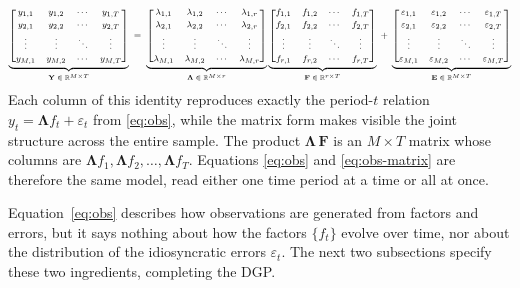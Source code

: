 \documentclass[11pt, a4paper, oneside]{article}
\newcommand{\mY}{\mathbf{Y}}
\newcommand{\mF}{\mathbf{F}}
\newcommand{\mL}{\boldsymbol{\Lambda}}
\newcommand{\mE}{\mathbf{E}}
\begin{document}
\[
{\footnotesize
\underbrace{\begin{bmatrix}
    y_{1,1} & y_{1,2} & \cdots & y_{1,T} \\[2pt]
    y_{2,1} & y_{2,2} & \cdots & y_{2,T} \\[2pt]
    \vdots  & \vdots  & \ddots & \vdots  \\[2pt]
    y_{M,1} & y_{M,2} & \cdots & y_{M,T}
\end{bmatrix}}_{\mY \;\in\; \mathbb{R}^{M \times T}}
\;=\;
\underbrace{\begin{bmatrix}
    \lambda_{1,1} & \lambda_{1,2} & \cdots & \lambda_{1,r} \\[2pt]
    \lambda_{2,1} & \lambda_{2,2} & \cdots & \lambda_{2,r} \\[2pt]
    \vdots        & \vdots        & \ddots & \vdots        \\[2pt]
    \lambda_{M,1} & \lambda_{M,2} & \cdots & \lambda_{M,r}
\end{bmatrix}}_{\mL \;\in\; \mathbb{R}^{M \times r}}
\underbrace{\begin{bmatrix}
    f_{1,1} & f_{1,2} & \cdots & f_{1,T} \\[2pt]
    f_{2,1} & f_{2,2} & \cdots & f_{2,T} \\[2pt]
    \vdots  & \vdots  & \ddots & \vdots  \\[2pt]
    f_{r,1} & f_{r,2} & \cdots & f_{r,T}
\end{bmatrix}}_{\mF \;\in\; \mathbb{R}^{r \times T}}
\;+\;
\underbrace{\begin{bmatrix}
    \varepsilon_{1,1} & \varepsilon_{1,2} & \cdots & \varepsilon_{1,T} \\[2pt]
    \varepsilon_{2,1} & \varepsilon_{2,2} & \cdots & \varepsilon_{2,T} \\[2pt]
    \vdots            & \vdots            & \ddots & \vdots            \\[2pt]
    \varepsilon_{M,1} & \varepsilon_{M,2} & \cdots & \varepsilon_{M,T}
\end{bmatrix}}_{\mE \;\in\; \mathbb{R}^{M \times T}}
}
\]
Each column of this identity reproduces exactly the period-$t$
relation $y_t = \mL f_t + \varepsilon_t$ from \eqref{eq:obs}, while
the matrix form makes visible the joint structure across the entire
sample. The product $\mL\,\mF$ is an $M \times T$ matrix whose
columns are $\mL f_1, \mL f_2, \ldots, \mL f_T$. Equations
\eqref{eq:obs} and \eqref{eq:obs-matrix} are therefore the same
model, read either one time period at a time or all at once.

Equation~\eqref{eq:obs} describes how observations are generated from
factors and errors, but it says nothing about how the factors
$\{f_t\}$ evolve over time, nor about the distribution of the
idiosyncratic errors $\varepsilon_t$. The next two subsections specify
these two ingredients, completing the DGP.
\end{document}
